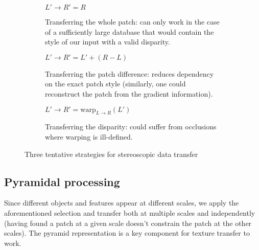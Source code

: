\begin{figure*}[ht!]
	\centering
	\begin{subfigure}{0.3\textwidth}
	\centering
		$L' \to R'=R$
		\caption{Transferring the whole patch: can only work in the case of a sufficiently large database that would contain the style of our input with a valid disparity.}
	\end{subfigure}\hfill
	\begin{subfigure}{0.3\textwidth}
	\centering
		$L' \to R'=L'+(R-L)$
		\caption{Transferring the patch difference: reduces dependency on the exact patch style (similarly, one could reconstruct the patch from the gradient information).}
	\end{subfigure}\hfill
	\begin{subfigure}{0.3\textwidth}
	\centering
		$L' \to R'=\textrm{warp}_{L\to R}(L')$
		\caption{Transferring the disparity: could suffer from occlusions where warping is ill-defined.}
	\end{subfigure}
	\caption{Three tentative strategies for stereoscopic data transfer}
	\label{fig:transfers}
\end{figure*}

\subsection{Pyramidal processing}
Since different objects and features appear at different scales, we apply the aforementioned selection and transfer both at multiple scales and independently (having found a patch at a given scale doesn't constrain the patch at the other scales).
The pyramid representation is a key component for texture transfer to work.

